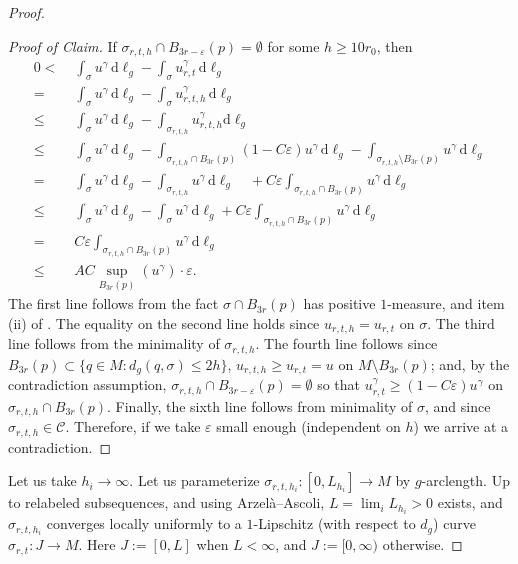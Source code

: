 \documentclass[12pt,a4paper,reqno]{amsart}
\theoremstyle{definition}
\renewcommand{\leq}{\leqslant}
\renewcommand{\geq}{\geqslant}
\newcommand{\eps}{\varepsilon}
\begin{document}
{\begin{proof}
\begin{proof}[Proof of Claim]
If $\sigma_{r,t,h}\cap B_{3r-\eps}(p)=\emptyset$ for some $h\geq 10r_0$, then 
\begin{align*}
0<\;&\int_\sigma u^\gamma \, \mathrm{d}\ell_g-\int_\sigma u_{r,t}^\gamma \, \mathrm{d}\ell_g \\
=\;& \int_\sigma u^\gamma \, \mathrm{d}\ell_g-\int_{\sigma} u_{r,t,h}^\gamma \, \mathrm{d}\ell_g\\
\leq\;& \int_\sigma u^\gamma \, \mathrm{d}\ell_g-\int_{\sigma_{r,t,h}} u_{r,t,h}^\gamma\mathrm{d}\ell_g \\
\leq\;& \int_\sigma u^\gamma \, \mathrm{d}\ell_g
- \int_{\sigma_{r,t,h}\cap B_{3r}(p)} (1-C\eps)u^\gamma \, \mathrm{d}\ell_g- \int_{\sigma_{r,t,h}\setminus B_{3r}(p)} u^\gamma \, \mathrm{d}\ell_g\\
=\;& \int_\sigma u^\gamma\, \mathrm{d}\ell_g
-\int_{\sigma_{r,t,h}} u^\gamma \, \mathrm{d}\ell_g
\quad + C\eps \int_{\sigma_{r,t,h}\cap B_{3r}(p)} u^\gamma \, \mathrm{d}\ell_g\\
\leq\;& \int_\sigma u^\gamma \, \mathrm{d}\ell_g
-\int_\sigma u^\gamma \, \mathrm{d}\ell_g
+ C\eps \int_{\sigma_{r,t,h}\cap B_{3r}(p)} u^\gamma \, \mathrm{d}\ell_g\\
=\;& C\eps \int_{\sigma_{r,t,h}\cap B_{3r}(p)} u^\gamma \, \mathrm{d}\ell_g\\
\leq \; & AC\sup_{B_{3r}(p)} (u^\gamma) \cdot \eps.
\end{align*}
The first line follows from the fact $\sigma\cap B_{3r}(p)$ has positive $1$-measure, and item (ii) of . The equality on the second line holds since $u_{r,t,h}=u_{r,t}$ on $\sigma$. The third line follows from the minimality of $\sigma_{r,t,h}$. The fourth line follows since $B_{3r}(p) \subset \{q\in M:d_g (q,\sigma)\leq 2h\}$, $u_{r,t,h}\geq u_{r,t}=u$ on $M\setminus B_{3r}(p)$; and, by the contradiction assumption, $\sigma_{r,t,h}\cap B_{3r-\eps}(p)=\emptyset$ so that $u^\gamma_{r,t}\geq (1-C\eps)u^\gamma$ on $\sigma_{r,t,h}\cap B_{3r}(p)$. Finally, the sixth line follows from minimality of $\sigma$, {and since $\sigma_{r,t,h}\in\mathcal{C}$}. Therefore, if we take $\eps$ small enough (independent on $h$) we arrive at a contradiction.
\end{proof}

{Let us take $h_i\to\infty$. Let us parameterize $\sigma_{r,t,h_i}:[0,L_{h_i}]\to M$ by $g$-arclength. Up to relabeled subsequences, and using Arzelà--Ascoli, $L=\lim_i L_{h_i}>0$ exists, and $\sigma_{r,t,h_i}$ converges locally uniformly to a $1$-Lipschitz (with respect to $d_g$) curve $\sigma_{r,t}:J\to M$. Here $J:=[0,L]$ when $L<\infty$, and $J:=[0,\infty)$ otherwise.

}
\end{proof}}
\end{document}
